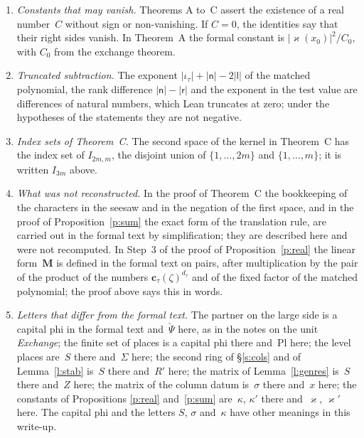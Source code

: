 \documentclass[11pt,a4paper]{article}
\newcommand{\m}[1]{\mbox{$#1$}}        %
\theoremstyle{plainx}
\theoremstyle{uprightx}
\newcommand{\ix}[1]{\mathsf{#1}}
\newcommand{\dL}{\check{\Psi}}         %
\newcommand{\Plc}{\mathrm{Pl}}         %
\newcommand{\lpl}{\Sigma}              %
\begin{document}
\begin{enumerate}[label=\textup{\arabic*.},leftmargin=1.6em,itemsep=5pt]
unnamed in the formal text.
\item \emph{Constants that may vanish.} Theorems A to~C assert the existence of a real number~$C$ without sign or
non-vanishing. If \m{C=0}, the identities say that their right sides vanish. In Theorem~A the formal constant is
\m{|\varkappa(x_0)|^2/C_0}, with $C_0$ from the exchange theorem.
\item \emph{Truncated subtraction.} The exponent \m{|\iota_\tau|+|\ix n|-2|\ix l|} of the matched polynomial, the
rank difference \m{|\ix n|-|\ix r|} and the exponent in the test value are differences of natural numbers, which
Lean truncates at zero; under the hypotheses of the statements they are not negative.
\item \emph{Index sets of Theorem~C.} The second space of the kernel in Theorem~C has the index set of
\m{I_{2m,m}}, the disjoint union of \m{\{1,\dots,2m\}} and \m{\{1,\dots,m\}}; it is written \m{I_{3m}} above.
\item \emph{What was not reconstructed.} In the proof of Theorem~C the bookkeeping of the characters in the seesaw
and in the negation of the first space, and in the proof of Proposition~\ref{p:sum} the exact form of the
translation rule, are carried out in the formal text by simplification; they are described here and were not
recomputed. In Step~3 of the proof of Proposition~\ref{p:real} the linear form~$\mathbf{M}$ is defined in the formal text on
pairs, after multiplication by the pair of the product of the numbers \m{\mathbf{c}_\tau(\zeta)^{d_\tau}} and of the fixed
factor of the matched polynomial; the proof above says this in words.
\item \emph{Letters that differ from the formal text.} The partner on the large side is a capital phi in the formal
text and~$\dL$ here, as in the notes on the unit \emph{Exchange}; the finite set of places is a capital phi there
and~$\Plc$ here; the level places are~$S$ there and~$\lpl$ here; the second ring of §\ref{s:cols} and of Lemma~\ref{l:stab}
is~$S$ there and~$R'$ here; the matrix of Lemma~\ref{l:genres} is~$S$ there and~$Z$ here; the matrix of the column
datum is~$\sigma$ there and~$x$ here; the constants of Propositions \ref{p:real} and~\ref{p:sum} are~$\kappa$,
$\kappa'$ there and~$\varkappa$, $\varkappa'$ here. The capital phi and the letters $S$, $\sigma$ and~$\kappa$ have other
meanings in this write-up.
\end{enumerate}
\end{document}
